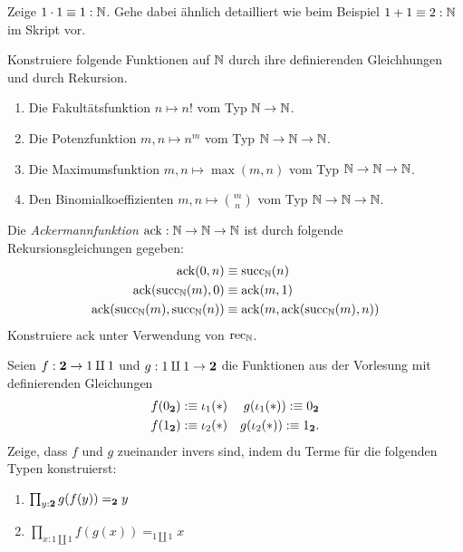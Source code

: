 \documentclass{uebung}
\begin{document}

\begin{exercise}
  Zeige $1\cdot 1\equiv 1:\mathbb{N}$.
  Gehe dabei ähnlich detailliert wie beim Beispiel $1+1\equiv 2:\mathbb{N}$ im Skript vor.
\end{exercise}

\begin{exercise}
  Konstruiere folgende Funktionen auf $\mathbb{N}$ durch ihre definierenden Gleichhungen und durch Rekursion.
  \begin{enumerate}
    \item Die Fakultätsfunktion $n\mapsto n!$ vom Typ $\mathbb{N}\to\mathbb{N}$.
    \item Die Potenzfunktion $m,n\mapsto n^m$ vom Typ $\mathbb{N}\to\mathbb{N}\to\mathbb{N}$.
    \item Die Maximumsfunktion $m,n\mapsto\max(m,n)$ vom Typ $\mathbb{N}\to\mathbb{N}\to\mathbb{N}$.
    \item Den Binomialkoeffizienten $m,n\mapsto\binom{m}{n}$ vom Typ $\mathbb{N}\to\mathbb{N}\to\mathbb{N}$.
  \end{enumerate}
\end{exercise}

\begin{exercise}
  Die \emph{Ackermannfunktion} $\mathrm{ack}:\mathbb{N}\to\mathbb{N}\to\mathbb{N}$ ist durch folgende Rekursionsgleichungen gegeben:
  \begin{align*}
    \mathrm{ack}(0,n)&\equiv\mathrm{succ}_{\mathbb{N}}(n)\\
    \mathrm{ack}(\mathrm{succ}_{\mathbb{N}}(m),0)&\equiv\mathrm{ack}(m,1)\\
    \mathrm{ack}(\mathrm{succ}_{\mathbb{N}}(m),\mathrm{succ}_{\mathbb{N}}(n))&\equiv\mathrm{ack}(m,\mathrm{ack}(\mathrm{succ}_{\mathbb{N}}(m),n))
  \end{align*}
  Konstruiere $\mathrm{ack}$ unter Verwendung von $\mathrm{rec}_{\mathbb{N}}$.
\end{exercise}


\begin{exercise}
  Seien $f:\mathbf{2}\to 1\amalg 1$ und $g:1\amalg 1\to\mathbf{2}$ die Funktionen aus der Vorlesung mit definierenden Gleichungen
  \begin{align*}
    f(0_{\mathbf{2}})&:\equiv\iota_1(\ast) &g(\iota_1(\ast)):\equiv 0_{\mathbf{2}}\\
    f(1_{\mathbf{2}})&:\equiv\iota_2(\ast)&g(\iota_2(\ast)):\equiv 1_{\mathbf{2}}.
  \end{align*}
  Zeige, dass $f$ und $g$ zueinander invers sind, indem du Terme für die folgenden Typen konstruierst:
  \begin{enumerate}
    \item $\prod_{y:\mathbf{2}} g(f(y))=_{\mathbf{2}} y$
    \item $\prod_{x:1\amalg 1} f(g(x))=_{1\amalg 1} x$
  \end{enumerate}
\end{exercise}
\end{document}
